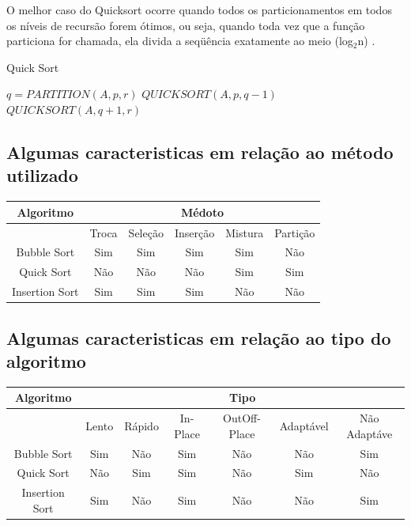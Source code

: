 \documentclass[12pt]{article}
\begin{document}
O melhor caso do Quicksort ocorre quando todos os particionamentos em todos os níveis de recursão forem ótimos, ou seja, quando toda vez que a função particiona for chamada, ela divida a seqüência exatamente ao meio (log$_2$n) \cite{prado2005analise}.
\begin{algorithm}[H]
		\caption{Quick Sort}
		\begin{algorithmic}[1]	
					\State$q = PARTITION(A, p, r)$
					\State$QUICKSORT(A, p, q - 1 )$
					\State$QUICKSORT(A, q +1, r)$
				\EndIf			
			\EndFunction
			
			
		\end{algorithmic}
	\end{algorithm}
	
	
\subsection{Algumas caracteristicas em relação ao método utilizado}
	\vspace{1cm}
\begin{tabular}{|c|c|c|c|c|c|}
	\hline 
	Algoritmo & \multicolumn{5}{c|}{Médoto} \\ 
	\hline 
	 & Troca & Seleção & Inserção & Mistura & Partição \\ 
	\hline 
	Bubble Sort & Sim & Sim & Sim & Sim & Não \\ 
	\hline 
	Quick Sort & Não & Não & Não & Sim & Sim \\ 
	\hline 
	Insertion Sort & Sim & Sim & Sim & Não & Não \\ 
	\hline 
	\end{tabular} 	
	\vspace{1cm}
\subsection{Algumas caracteristicas em relação ao tipo do algoritmo }
\vspace{1cm}
\begin{tabular}{|c|c|c|c|c|c|c|}
\hline 
Algoritmo & \multicolumn{6}{c|}{Tipo} \\ 
\hline 
&Lento&Rápido&In-Place&OutOff-Place&Adaptável&Não Adaptáve\\ 
\hline 
Bubble Sort&Sim & Não & Sim & Não & Não & Sim  \\ 
\hline 
Quick Sort& Não & Sim & Sim & Não & Sim & Não  \\ 
\hline 
Insertion Sort& Sim & Não & Sim & Não & Não & Sim \\ 
\hline 
\end{tabular} 
\end{document}
